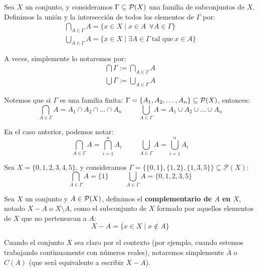 \begin{definicion}
    Sea $X$ un conjunto, y consideramos $\Gamma \subseteq \mathcal{P}(X)$ una familia de subconjuntos de $X$. Definimos la unión y la intersección de todos los elementos de $\Gamma$ por:
    \begin{gather*}
        \bigcap_{A \in \Gamma} A = \{x \in X \mid x \in A~~\forall A \in \Gamma \}\\
        \bigcup_{A \in \Gamma} A = \{x \in X \mid \exists A \in \Gamma\ \text{tal que}\ x \in A \}
    \end{gather*}

    A veces, simplemente lo notaremos por:
    \begin{gather*}
        \bigcap \Gamma := \bigcap_{A\in \Gamma}A \\
        \bigcup \Gamma := \bigcup_{A\in \Gamma}A
    \end{gather*}

    Notemos que si $\Gamma$ es una familia finita: $\Gamma = \{A_1, A_2, \ldots, A_n\} \subseteq \mathcal{P}(X)$, entonces:
    \begin{equation*}
        \bigcap_{A \in \Gamma}A = A_1 \cap A_2 \cap \ldots \cap A_n
        \hspace{1cm}
        \bigcup_{A \in \Gamma}A = A_1 \cup A_2 \cup \ldots \cup A_n
    \end{equation*}
    
    En el caso anterior, podemos notar:
    \begin{equation*}
        \bigcap_{A \in \Gamma}A = \bigcap_{i=1}^n A_i
        \hspace{1cm}
        \bigcup_{A \in \Gamma}A = \bigcup_{i=1}^n A_i
    \end{equation*}
\end{definicion}

\begin{ejemplo}
Sea $X = \{0, 1, 2, 3, 4, 5\}$, y consideramos ${\Gamma = \{\{0, 1\}, \{1, 2\}, \{1, 3, 5\}\}\subseteq \mathcal{P}(X)}$:
    \begin{equation*}
        \bigcap_{A \in \Gamma}A = \{1\}
        \hspace{1cm}
        \bigcup_{A \in \Gamma}A = \{0, 1, 2, 3, 5\}
    \end{equation*}
\end{ejemplo}

\begin{definicion}[Complementario]
    Sea $X$ un conjunto y $A \in \mathcal{P}(X)$, definimos el \textbf{complementario de $A$ en $X$}, notado $X-A$ o $X\setminus A$, como el subconjunto de $X$ formado por aquellos elementos de $X$ que no pertenezcan a $A$:
    $$X-A = \{x \in X \mid x \notin A\}$$
\end{definicion}
\begin{notacion}
    Cuando el conjunto $X$ sea claro por el contexto (por ejemplo, cuando estemos trabajando continuamente con números reales), notaremos simplemente $\overline{A}$ o $C(A)$ (que será equivalente a escribir $X-A$).
\end{notacion}


